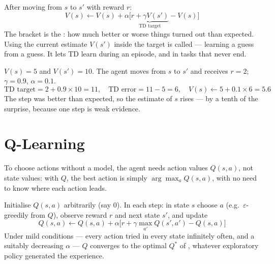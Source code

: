 \begin{definitionbox}[TD(0) Update]
After moving from $s$ to $s'$ with reward $r$:
\[
V(s) \leftarrow V(s) + \alpha\big[\underbrace{r + \gamma V(s')}_{\text{TD target}} - V(s)\big]
\]
The bracket is the : how much better or worse things turned out than
expected. Using the current estimate $V(s')$ inside the target is called
 --- learning a guess from a guess. It lets TD learn during an
episode, and in tasks that never end.
\end{definitionbox}

\begin{worked}
$V(s) = 5$ and $V(s') = 10$. The agent moves from $s$ to $s'$ and receives $r = 2$;
$\gamma = 0.9$, $\alpha = 0.1$.
\[
\text{TD target} = 2 + 0.9 \times 10 = 11, \quad \text{TD error} = 11 - 5 = 6, \quad
V(s) \leftarrow 5 + 0.1 \times 6 = \mathbf{5.6}
\]
The step was better than expected, so the estimate of $s$ rises --- by a tenth of the
surprise, because one step is weak evidence.
\end{worked}

\section{Q-Learning}

To choose actions without a model, the agent needs action values $Q(s, a)$, not state
values: with $Q$, the best action is simply $\arg\max_a Q(s, a)$, with no need to know
where each action leads.

\begin{definitionbox}
Initialise $Q(s, a)$ arbitrarily (say 0). In each step: in state $s$ choose $a$
(e.g.\ $\varepsilon$-greedily from $Q$), observe reward $r$ and next state $s'$, and
update
\[
Q(s, a) \leftarrow Q(s, a) + \alpha\Big[r + \gamma\max_{a'} Q(s', a') - Q(s, a)\Big]
\]
Under mild conditions --- every action tried in every state infinitely often, and a
suitably decreasing $\alpha$ --- $Q$ converges to the optimal $Q^{*}$ of ,
whatever exploratory policy generated the experience.
\end{definitionbox}


